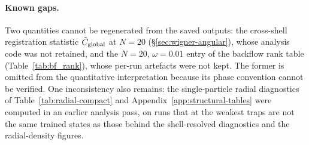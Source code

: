 \paragraph{Known gaps.} Two quantities cannot be regenerated from the saved outputs: the
cross-shell registration statistic $\tilde C_{\rm global}$ at $N{=}20$
(\S\ref{sec:wigner-angular}), whose analysis code was not retained, and the $N{=}20$,
$\omega=0.01$ entry of the backflow rank table (Table~\ref{tab:bf_rank}), whose per-run
artefacts were not kept. The former is omitted from the quantitative interpretation because
its phase convention cannot be verified. One inconsistency also remains: the single-particle radial
diagnostics of Table~\ref{tab:radial-compact} and Appendix~\ref{app:structural-tables} were
computed in an earlier analysis pass, on runs that at the weakest traps are not the same
trained states as those behind the shell-resolved diagnostics and the radial-density
figures.
